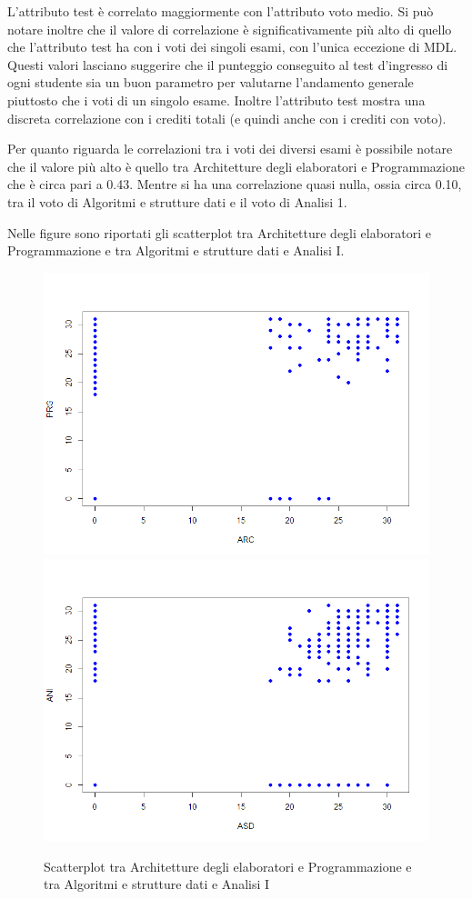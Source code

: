 \documentclass[12pt]{article}
\begin{document}
L'attributo test è correlato maggiormente con l'attributo voto medio. 
Si può notare inoltre che il valore di correlazione è significativamente più alto di quello che l'attributo test ha con i voti dei singoli esami, con l'unica eccezione di MDL.
Questi valori lasciano suggerire che il punteggio conseguito al test d'ingresso di ogni studente sia un buon parametro per valutarne l'andamento generale piuttosto che i voti di un singolo esame.
Inoltre l'attributo test mostra una discreta correlazione con i crediti totali (e quindi anche con i crediti con voto).

Per quanto riguarda le correlazioni tra i voti dei diversi esami è possibile notare che il valore più alto è quello tra Architetture degli elaboratori e Programmazione che è circa pari a 0.43.
Mentre si ha una correlazione quasi nulla, ossia circa 0.10, tra il voto di Algoritmi e strutture dati e il voto di Analisi 1.

Nelle figure sono riportati gli scatterplot tra Architetture degli elaboratori e Programmazione e tra Algoritmi e strutture dati  e Analisi I.

\begin{figure}[H]
	\centering
	\includegraphics[width=\textwidth]{img/arcPrg.png}
	\includegraphics[width=\textwidth]{img/asdAni.png}
	\captionsetup{justification=centering}
	\caption{Scatterplot tra Architetture degli elaboratori e Programmazione e tra Algoritmi e strutture dati e Analisi I}
\end{figure}
\end{document}
